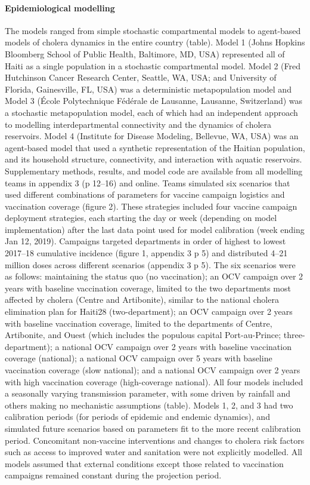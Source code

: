       \paragraph{Epidemiological modelling} The models ranged from simple stochastic compartmental models to agent-based models of cholera dynamics in the entire country (table). Model 1 (Johns Hopkins Bloomberg School of Public Health, Baltimore, MD, USA) represented all of Haiti as a single population in a stochastic compartmental model. Model 2 (Fred Hutchinson Cancer Research Center, Seattle, WA, USA; and University of Florida, Gainesville, FL, USA) was a deterministic metapopulation model and Model 3 (École Polytechnique Fédérale de Lausanne, Lausanne, Switzerland) was a stochastic metapopulation model, each of which had an independent approach to modelling interdepartmental connectivity and the dynamics of cholera reservoirs. Model 4 (Institute for Disease Modeling, Bellevue, WA, USA) was an agent-based model that used a synthetic representation of the Haitian population, and its household structure, connectivity, and interaction with aquatic reservoirs. Supplementary methods, results, and model code are available from all modelling teams in appendix 3 (p 12–16) and online. Teams simulated six scenarios that used different combinations of parameters for vaccine campaign logistics and vaccination coverage (figure 2). These strategies included four vaccine campaign deployment strategies, each starting the day or week (depending on model implementation) after the last data point used for model calibration (week ending Jan 12, 2019). Campaigns targeted departments in order of highest to lowest 2017–18 cumulative incidence (figure 1, appendix 3 p 5) and distributed 4–21 million doses across different scenarios (appendix 3 p 5). The six scenarios were as follows: maintaining the status quo (no vaccination); an OCV campaign over 2 years with baseline vaccination coverage, limited to the two departments most affected by cholera (Centre and Artibonite), similar to the national cholera elimination plan for Haiti28 (two-department); an OCV campaign over 2 years with baseline vaccination coverage, limited to the departments of Centre, Artibonite, and Ouest (which includes the populous capital Port-au-Prince; three-department); a national OCV campaign over 2 years with baseline vaccination coverage (national); a national OCV campaign over 5 years with baseline vaccination coverage (slow national); and a national OCV campaign over 2 years with high vaccination coverage (high-coverage national). All four models included a seasonally varying transmission parameter, with some driven by rainfall and others making no mechanistic assumptions (table). Models 1, 2, and 3 had two calibration periods (for periods of epidemic and endemic dynamics), and simulated future scenarios based on parameters fit to the more recent calibration period. Concomitant non-vaccine interventions and changes to cholera risk factors such as access to improved water and sanitation were not explicitly modelled. All models assumed that external conditions except those related to vaccination campaigns remained constant during the projection period. 
